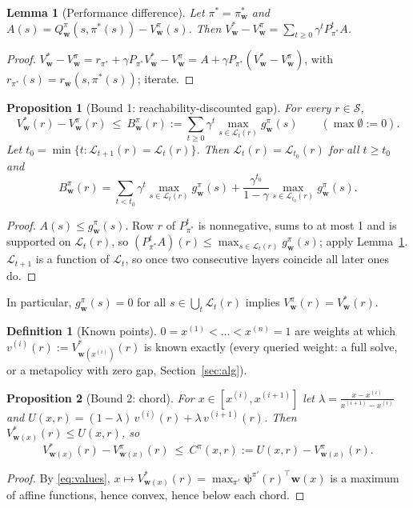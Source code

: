 \documentclass[11pt]{article}
\newcommand{\vpsi}{\bm{\psi}}
\newcommand{\w}{\mathbf{w}}
\newcommand{\cS}{\mathcal S}
\newcommand{\cL}{\mathcal L}
\newtheorem{proposition}{Proposition}
\newtheorem{lemma}{Lemma}
\theoremstyle{definition}
\newtheorem{definition}{Definition}
\begin{document}
\begin{lemma}[Performance difference]\label{lem:pd}
Let $\pi^*=\pi^*_\w$ and $A(s)=Q^\pi_\w(s,\pi^*(s))-V^\pi_\w(s)$. Then
$V^*_\w-V^\pi_\w=\sum_{t\ge0}\gamma^tP_{\pi^*}^tA$.
\end{lemma}
\begin{proof}
$V^*_\w-V^\pi_\w=r_{\pi^*}+\gamma P_{\pi^*}V^*_\w-V^\pi_\w=A+\gamma P_{\pi^*}(V^*_\w-V^\pi_\w)$, with
$r_{\pi^*}(s)=r_\w(s,\pi^*(s))$; iterate.
\end{proof}

\begin{proposition}[Bound 1: reachability-discounted gap]\label{prop:reach}
For every $r\in\cS$,
\[
V^*_\w(r)-V^\pi_\w(r)\ \le\ B^\pi_\w(r):=\sum_{t\ge0}\gamma^t\max_{s\in\cL_t(r)}g^\pi_\w(s)\qquad(\max\emptyset:=0).
\]
Let $t_0=\min\{t:\cL_{t+1}(r)=\cL_t(r)\}$. Then $\cL_t(r)=\cL_{t_0}(r)$ for all $t\ge t_0$ and
\[
B^\pi_\w(r)=\sum_{t<t_0}\gamma^t\max_{s\in\cL_t(r)}g^\pi_\w(s)+\frac{\gamma^{t_0}}{1-\gamma}\max_{s\in\cL_{t_0}(r)}g^\pi_\w(s).
\]
\end{proposition}
\begin{proof}
$A(s)\le g^\pi_\w(s)$. Row $r$ of $P_{\pi^*}^t$ is nonnegative, sums to at most 1 and is supported on
$\cL_t(r)$, so $(P_{\pi^*}^tA)(r)\le\max_{s\in\cL_t(r)}g^\pi_\w(s)$; apply Lemma~\ref{lem:pd}. $\cL_{t+1}$ is a
function of $\cL_t$, so once two consecutive layers coincide all later ones do.
\end{proof}

\noindent In particular, $g^\pi_\w(s)=0$ for all $s\in\bigcup_t\cL_t(r)$ implies $V^\pi_\w(r)=V^*_\w(r)$.

\begin{definition}[Known points]
$0=x^{(1)}<\dots<x^{(n)}=1$ are weights at which $v^{(i)}(r):=V^*_{\w(x^{(i)})}(r)$ is known exactly
(every queried weight: a full solve, or a metapolicy with zero gap, Section~\ref{sec:alg}).
\end{definition}

\begin{proposition}[Bound 2: chord]\label{prop:chord}
For $x\in[x^{(i)},x^{(i+1)}]$ let $\lambda=\frac{x-x^{(i)}}{x^{(i+1)}-x^{(i)}}$ and
$U(x,r)=(1-\lambda)\,v^{(i)}(r)+\lambda\,v^{(i+1)}(r)$. Then $V^*_{\w(x)}(r)\le U(x,r)$, so
\[
V^*_{\w(x)}(r)-V^\pi_{\w(x)}(r)\ \le\ C^\pi(x,r):=U(x,r)-V^\pi_{\w(x)}(r).
\]
\end{proposition}
\begin{proof}
By \eqref{eq:values}, $x\mapsto V^*_{\w(x)}(r)=\max_{\pi'}\vpsi^{\pi'}(r)^\top\w(x)$ is a maximum of affine
functions, hence convex, hence below each chord.
\end{proof}
\end{document}
